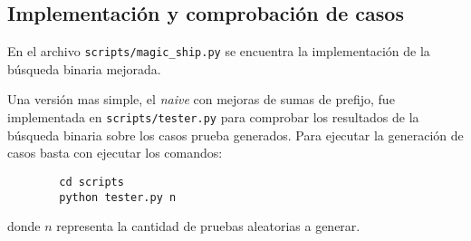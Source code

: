 \documentclass{article}
\theoremstyle{default}
\begin{document}
\subsection{Implementación y comprobación de casos}
	En el archivo \texttt{scripts/magic\_ship.py} se encuentra la implementación de la búsqueda binaria mejorada.

	Una versión mas simple, el \textit{naive} con mejoras de sumas de prefijo, fue implementada en \texttt{scripts/tester.py} para comprobar los resultados de la búsqueda binaria sobre los casos prueba generados. Para ejecutar la generación de casos basta con ejecutar los comandos:
	\begin{verbatim}
	    cd scripts
	    python tester.py n
	\end{verbatim}
	donde $n$ representa la cantidad de pruebas aleatorias a generar.
%
%
%
\end{document}
